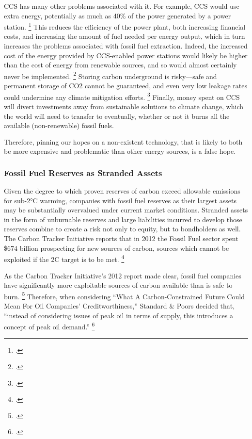 CCS has many other problems associated with it. For example, CCS would use extra energy, potentially as much as 40\% of the power generated by a power station. \footcite{GPCCS}
This reduces the efficiency of the power plant, both increasing financial costs, and increasing the amount of fuel needed per energy output, which in turn increases the problems associated with fossil fuel extraction.
Indeed, the increased cost of the energy provided by CCS-enabled power stations would likely be higher than the cost of energy from renewable sources, and so would almost certainly never be implemented. \footcite{SmartPlanetCCS}
Storing carbon underground is risky—safe and permanent storage of CO2 cannot be guaranteed, and even very low leakage rates could undermine any climate mitigation efforts. \footcite{GPCCS}
Finally, money spent on CCS will divert investments away from sustainable solutions to climate change, which the world will need to transfer to eventually, whether or not it burns all the available (non-renewable) fossil fuels.

Therefore, pinning our hopes on a non-existent technology, that is likely to both be more expensive and problematic than other energy sources, is a false hope.




\subsubsection {Fossil Fuel Reserves as Stranded Assets} 



Given the degree to which proven reserves of carbon exceed allowable emissions for sub-2°C warming, companies with fossil fuel reserves as their largest assets may be substantially overvalued under current market conditions. 
Stranded assets in the form of unburnable reserves and large liabilities incurred to develop those reserves combine to create a risk not only to equity, but to bondholders as well.
The Carbon Tracker Initiative reports that in 2012 the Fossil Fuel sector spent \$674 billion prospecting for new sources of carbon, sources which cannot be exploited if the 2C target is to be met. \footcite{CTI2013}

As the Carbon Tracker Initiative's 2012 report made clear, fossil fuel companies have significantly more exploitable sources of carbon available than is safe to burn. \footcite{CTI2012}
Therefore, when considering ``What A Carbon-Constrained Future Could Mean For Oil Companies' Creditworthiness,'' Standard & Poors decided that, ``instead of considering issues of peak oil in terms of supply, this introduces a concept of peak oil demand.'' \footcite{SandPConstrained}


